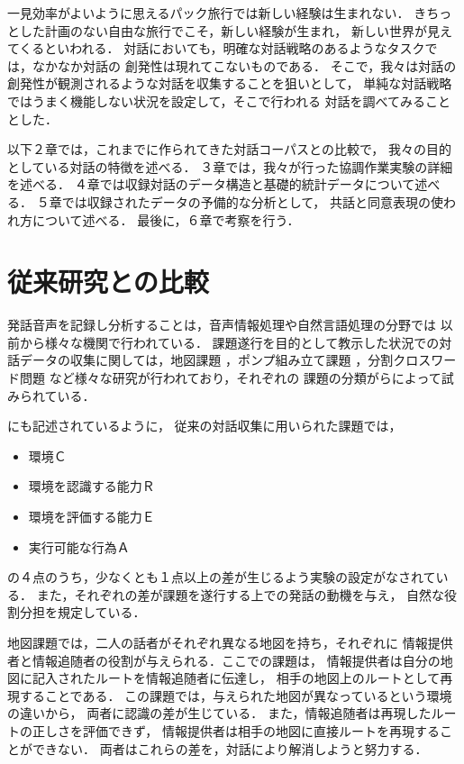 一見効率がよいように思えるパック旅行では新しい経験は生まれない．
きちっとした計画のない自由な旅行でこそ，新しい経験が生まれ，
新しい世界が見えてくるといわれる．
対話においても，明確な対話戦略のあるようなタスクでは，なかなか対話の
創発性は現れてこないものである．
そこで，我々は対話の創発性が観測されるような対話を収集することを狙いとして，
単純な対話戦略ではうまく機能しない状況を設定して，そこで行われる
対話を調べてみることとした．

以下２章では，これまでに作られてきた対話コーパスとの比較で，
我々の目的としている対話の特徴を述べる．
３章では，我々が行った協調作業実験の詳細を述べる．
４章では収録対話のデータ構造と基礎的統計データについて述べる．
５章では収録されたデータの予備的な分析として，
共話と同意表現の使われ方について述べる．
最後に，６章で考察を行う．

\vspace{-10mm}
\newpage

\section{従来研究との比較}

発話音声を記録し分析することは，音声情報処理や自然言語処理の分野では
以前から様々な機関で行われている\cite{TakezawaAndSuematsu1995}．
課題遂行を目的として教示した状況での対話データの収集に関しては，地図課題
\cite[など]{Anderson.etal.1991,Koiso.etal.1996a}，ポンプ組み立て課題
\cite{Grosz1977,Chapanis.etal.1977,Cohen1984}，分割クロスワード問題
\cite{Nakazato.etal.1995}など様々な研究が行われており，それぞれの
課題の分類が\cite{Ishizaki.etal.1995}らによって試みられている．

\cite{Ishizaki.etal.1995}にも記述されているように，
従来の対話収集に用いられた課題では，
\begin{itemize}
\item 環境Ｃ
\item 環境を認識する能力Ｒ
\item 環境を評価する能力Ｅ
\item 実行可能な行為Ａ
\end{itemize}
の４点のうち，少なくとも１点以上の差が生じるよう実験の設定がなされている．
また，それぞれの差が課題を遂行する上での発話の動機を与え，
自然な役割分担を規定している．

地図課題では，二人の話者がそれぞれ異なる地図を持ち，それぞれに
情報提供者と情報追随者の役割が与えられる．ここでの課題は，
情報提供者は自分の地図に記入されたルートを情報追随者に伝達し，
相手の地図上のルートとして再現することである．
この課題では，与えられた地図が異なっているという環境の違いから，
両者に認識の差が生じている．
また，情報追随者は再現したルートの正しさを評価できず，
情報提供者は相手の地図に直接ルートを再現することができない．
両者はこれらの差を，対話により解消しようと努力する．

